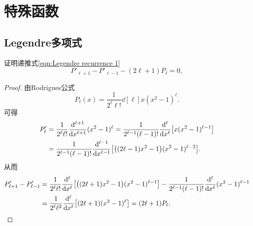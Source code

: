 
\chapter{特殊函数}

\section{Legendre多项式}

证明递推式\eqref{eqn:Legendre recurrence 1}
\[
    P'_{\ell+1}-P'_{\ell-1}-(2\ell+1)P_\ell=0,
\]
\begin{proof}
    由Rodrigues公式
    \begin{equation}
        P_\ell(x)=\frac1{2^\ell\ell!}\dd[\ell]x(x^2-1)^\ell.
    \end{equation}
    可得
    \begin{align*}
        P'_\ell&=\frac1{2^\ell\ell!}\dd[\ell+1]x(x^2-1)^\ell=\frac1{2^{\ell-1}(\ell-1)!}\dd[\ell]x\bigfkh{x(x^2-1)^{\ell-1}}\\
        &=\frac1{2^{\ell-1}(\ell-1)!}\dd[\ell-1]x\bigfkh{\bigkh{(2\ell-1)x^2-1}(x^2-1)^{\ell-2}}.
    \end{align*}
    从而 
    \begin{align*}
        P_{\ell+1}'-P_{\ell-1}'&=\frac1{2^\ell\ell!}\dd[\ell]x\bigfkh{\bigkh{(2\ell+1)x^2-1}(x^2-1)^{\ell-1}}-\frac1{2^{\ell-1}(\ell-1)!}\dd[\ell]x(x^2-1)^{\ell-1}\\
        &=\frac1{2^\ell\ell^2}\dd[\ell]x\bigfkh{(2\ell+1)(x^2-1)^\ell}=(2\ell+1)P_\ell.\qedhere
    \end{align*}
\end{proof}

